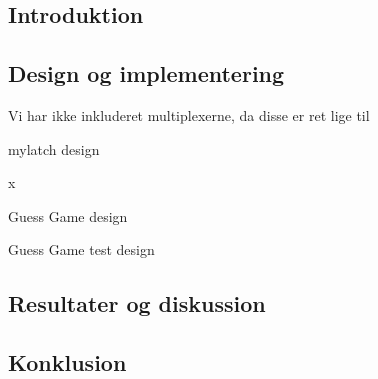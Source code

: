 \documentclass[../journal.tex]{subfiles}
\begin{document}
\subsection{Introduktion}

\subsection{Design og implementering}
Vi har ikke inkluderet multiplexerne, da disse er ret lige til
\begin{table}[H]
    \centering
      \framebox{
        \rule{8pt}{0pt}
          
  }
  \caption{mylatch design}	
  \label{src:mylatch}
\end{table}

\begin{table}[H]
    \centering
      \framebox{
        \rule{8pt}{0pt}
          
  }
  \caption{x}
  \label{src:compare_logic}
\end{table}

\begin{table}[H]
    \centering
      \framebox{
        \rule{8pt}{0pt}
          
  }
  \caption{Guess Game design}	
  \label{src:guess_game}
\end{table}

\begin{table}[H]
  \centering
    \framebox{
      \rule{8pt}{0pt}
        
}
\caption{Guess Game test design}	
\label{src:guess_game_test}
\end{table}

\subsection{Resultater og diskussion}

\subsection{Konklusion}
\end{document}
